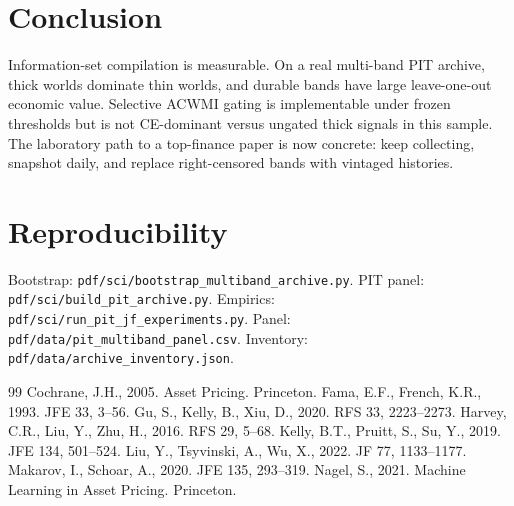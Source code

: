 \documentclass[12pt]{article}
\begin{document}
\section{Conclusion}

Information-set compilation is measurable. On a real multi-band PIT archive, thick worlds dominate thin worlds, and durable bands have large leave-one-out economic value. Selective ACWMI gating is implementable under frozen thresholds but is not CE-dominant versus ungated thick signals in this sample. The laboratory path to a top-finance paper is now concrete: keep collecting, snapshot daily, and replace right-censored bands with vintaged histories.

\appendix
\section{Reproducibility}
Bootstrap: \texttt{pdf/sci/bootstrap\_multiband\_archive.py}. PIT panel: \texttt{pdf/sci/build\_pit\_archive.py}. Empirics: \texttt{pdf/sci/run\_pit\_jf\_experiments.py}. Panel: \texttt{pdf/data/pit\_multiband\_panel.csv}. Inventory: \texttt{pdf/data/archive\_inventory.json}.

\begin{thebibliography}{99}
 Cochrane, J.H., 2005. Asset Pricing. Princeton.
 Fama, E.F., French, K.R., 1993. JFE 33, 3--56.
 Gu, S., Kelly, B., Xiu, D., 2020. RFS 33, 2223--2273.
 Harvey, C.R., Liu, Y., Zhu, H., 2016. RFS 29, 5--68.
 Kelly, B.T., Pruitt, S., Su, Y., 2019. JFE 134, 501--524.
 Liu, Y., Tsyvinski, A., Wu, X., 2022. JF 77, 1133--1177.
 Makarov, I., Schoar, A., 2020. JFE 135, 293--319.
 Nagel, S., 2021. Machine Learning in Asset Pricing. Princeton.
\end{thebibliography}
\end{document}
